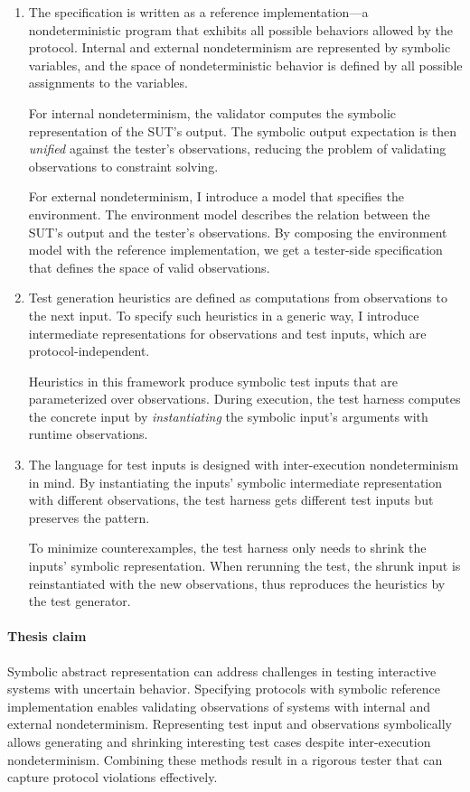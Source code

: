 \begin{enumerate}
\item The specification is written as a reference implementation---a
  nondeterministic program that exhibits all possible behaviors allowed by the
  protocol.  Internal and external nondeterminism are represented by symbolic
  variables, and the space of nondeterministic behavior is defined by all
  possible assignments to the variables.

  For internal nondeterminism, the validator computes the symbolic
  representation of the SUT's output.  The symbolic output expectation is then
  {\em unified} against the tester's observations, reducing the problem of
  validating observations to constraint solving.

  For external nondeterminism, I introduce a model that specifies the
  environment.  The environment model describes the relation between the SUT's
  output and the tester's observations.  By composing the environment model with
  the reference implementation, we get a tester-side specification that defines
  the space of valid observations.
\item Test generation heuristics are defined as computations from observations
  to the next input.  To specify such heuristics in a generic way, I introduce
  intermediate representations for observations and test inputs, which are
  protocol-independent.

  Heuristics in this framework produce symbolic test inputs that are
  parameterized over observations.  During execution, the test harness computes
  the concrete input by {\em instantiating} the symbolic input's arguments with
  runtime observations.
\item The language for test inputs is designed with inter-execution
  nondeterminism in mind.  By instantiating the inputs' symbolic intermediate
  representation with different observations, the test harness gets different
  test inputs but preserves the pattern.

  To minimize counterexamples, the test harness only needs to shrink the inputs'
  symbolic representation.  When rerunning the test, the shrunk input is
  reinstantiated with the new observations, thus reproduces the heuristics by
  the test generator.
\end{enumerate}

\paragraph{Thesis claim}
Symbolic abstract representation can address challenges in testing interactive
systems with uncertain behavior.  Specifying protocols with symbolic reference
implementation enables validating observations of systems with internal and
external nondeterminism.  Representing test input and observations symbolically
allows generating and shrinking interesting test cases despite inter-execution
nondeterminism.  Combining these methods result in a rigorous tester that can
capture protocol violations effectively.

